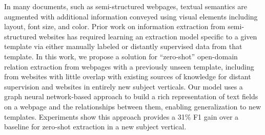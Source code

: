 In many documents, such as semi-structured webpages, textual semantics are augmented with additional information conveyed using visual elements including layout, font size, and color. Prior work on information extraction from semi-structured websites has required learning an extraction model specific to a given template via either manually labeled or distantly supervised data from that template. In this work, we propose a solution for ``zero-shot'' open-domain relation extraction from webpages with a previously unseen template, including from websites with little overlap with existing sources of knowledge for distant supervision and websites in entirely new subject verticals. Our model uses a graph neural network-based approach to build a rich representation of text fields on a webpage and the relationships between them, enabling generalization to new templates. Experiments show this approach provides a 31\% F1 gain over a baseline for zero-shot extraction in a new subject vertical.
